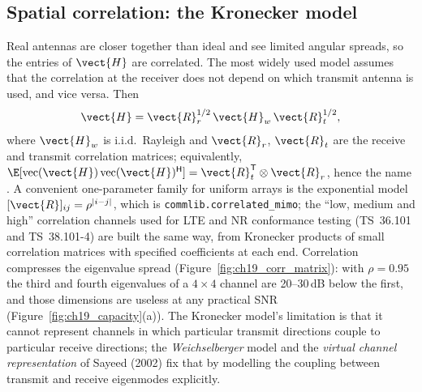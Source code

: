 
\subsection{Spatial correlation: the Kronecker model}

Real antennas are closer together than ideal and see limited angular spreads, so the entries of
$\vect{H}$ are correlated. The most widely used model assumes that the correlation at the receiver
does not depend on which transmit antenna is used, and vice versa. Then
\begin{equation}
\vect{H}=\vect{R}_r^{1/2}\,\vect{H}_w\,\vect{R}_t^{1/2},
\label{eq:ch19:kron}
\end{equation}
where $\vect{H}_w$ is i.i.d.\ Rayleigh and $\vect{R}_r$, $\vect{R}_t$ are the receive and transmit
correlation matrices; equivalently,
$\E[\operatorname{vec}(\vect{H})\operatorname{vec}(\vect{H})^{\mathsf H}]=\vect{R}_t^{\mathsf T}\otimes\vect{R}_r$,
hence the name . A convenient one-parameter family for uniform arrays is the
exponential model $[\vect{R}]_{ij}=\rho^{|i-j|}$, which is \texttt{commlib.correlated\_mimo}; the
``low, medium and high'' correlation channels used for LTE and NR conformance testing (TS~36.101 and
TS~38.101-4) are built the same way, from Kronecker products of small correlation matrices with
specified coefficients at each end. Correlation compresses the eigenvalue spread (Figure~\ref{fig:ch19_corr_matrix}): with $\rho=0.95$ the
third and fourth eigenvalues of a $4\times4$ channel are 20--30\,dB below the first, and those
dimensions are useless at any practical SNR (Figure~\ref{fig:ch19_capacity}(a)). The Kronecker
model's limitation is that it cannot represent channels in which particular transmit directions
couple to particular receive directions; the \emph{Weichselberger} model and the \emph{virtual
channel representation} of Sayeed (2002) fix that by modelling the coupling between transmit and
receive eigenmodes explicitly.

